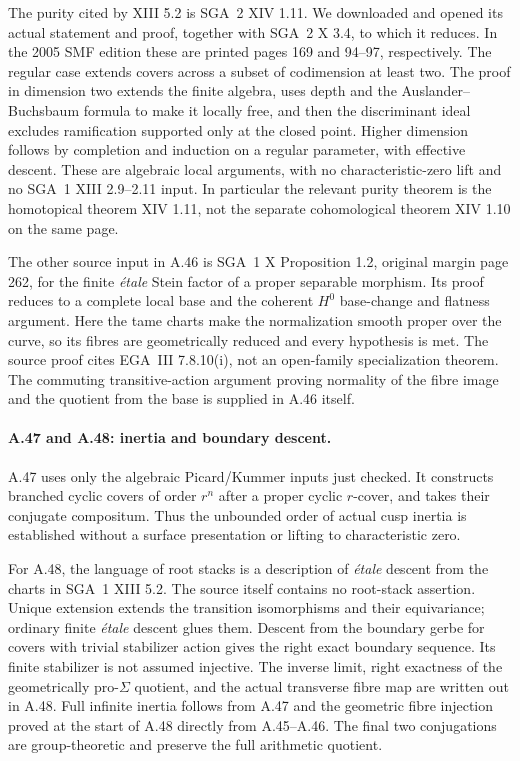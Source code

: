 The purity cited by XIII 5.2 is SGA~2 XIV 1.11. We downloaded
and opened its actual statement and proof, together with SGA~2
X 3.4, to which it reduces. In the 2005 SMF edition these are
printed pages 169 and 94--97, respectively. The regular case
extends covers across a subset of codimension at least two.
The proof in dimension two extends the finite algebra, uses
depth and the Auslander--Buchsbaum formula to make it locally
free, and then the discriminant ideal excludes ramification
supported only at the closed point. Higher dimension follows
by completion and induction on a regular parameter, with
effective descent. These are algebraic local arguments, with
no characteristic-zero lift and no SGA~1 XIII 2.9--2.11 input.
In particular the relevant purity theorem is the homotopical
theorem XIV 1.11, not the separate cohomological theorem XIV 1.10
on the same page.

The other source input in A.46 is SGA~1 X Proposition 1.2,
original margin page 262, for the finite \emph{\'etale} Stein
factor of a proper separable morphism. Its proof reduces to
a complete local base and the coherent $H^0$ base-change and
flatness argument. Here the tame charts make the normalization
smooth proper over the curve, so its fibres are geometrically
reduced and every hypothesis is met. The source proof cites
EGA~III 7.8.10(i), not an open-family specialization theorem.
The commuting transitive-action argument proving normality of
the fibre image and the quotient from the base is supplied in
A.46 itself.

\paragraph{A.47 and A.48: inertia and boundary descent.}
A.47 uses only the algebraic Picard/Kummer inputs just checked.
It constructs branched cyclic covers of order $r^n$ after a proper
cyclic $r$-cover, and takes their conjugate compositum. Thus the
unbounded order of actual cusp inertia is established without a
surface presentation or lifting to characteristic zero.

For A.48, the language of root stacks is a description of
\emph{\'etale} descent from the charts in SGA~1 XIII 5.2. The
source itself contains no root-stack assertion. Unique extension
extends the transition isomorphisms and their equivariance;
ordinary finite \emph{\'etale} descent glues them. Descent from
the boundary gerbe for covers with trivial stabilizer action gives
the right exact boundary sequence. Its finite stabilizer is not
assumed injective. The inverse limit, right exactness of the
geometrically pro-$\Sigma$ quotient, and the actual transverse
fibre map are written out in A.48. Full infinite inertia follows
from A.47 and the geometric fibre injection proved at the start of
A.48 directly from A.45--A.46. The final two conjugations are
group-theoretic and preserve the full arithmetic quotient.

